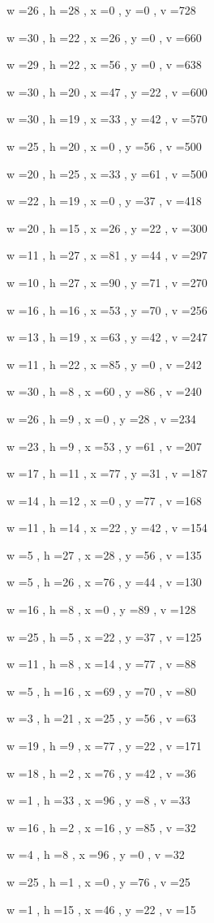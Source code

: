 \documentclass[11pt]{article}
\begin{document}
w =26 , h =28 , x =0 , y =0 , v =728
\par
w =30 , h =22 , x =26 , y =0 , v =660
\par
w =29 , h =22 , x =56 , y =0 , v =638
\par
w =30 , h =20 , x =47 , y =22 , v =600
\par
w =30 , h =19 , x =33 , y =42 , v =570
\par
w =25 , h =20 , x =0 , y =56 , v =500
\par
w =20 , h =25 , x =33 , y =61 , v =500
\par
w =22 , h =19 , x =0 , y =37 , v =418
\par
w =20 , h =15 , x =26 , y =22 , v =300
\par
w =11 , h =27 , x =81 , y =44 , v =297
\par
w =10 , h =27 , x =90 , y =71 , v =270
\par
w =16 , h =16 , x =53 , y =70 , v =256
\par
w =13 , h =19 , x =63 , y =42 , v =247
\par
w =11 , h =22 , x =85 , y =0 , v =242
\par
w =30 , h =8 , x =60 , y =86 , v =240
\par
w =26 , h =9 , x =0 , y =28 , v =234
\par
w =23 , h =9 , x =53 , y =61 , v =207
\par
w =17 , h =11 , x =77 , y =31 , v =187
\par
w =14 , h =12 , x =0 , y =77 , v =168
\par
w =11 , h =14 , x =22 , y =42 , v =154
\par
w =5 , h =27 , x =28 , y =56 , v =135
\par
w =5 , h =26 , x =76 , y =44 , v =130
\par
w =16 , h =8 , x =0 , y =89 , v =128
\par
w =25 , h =5 , x =22 , y =37 , v =125
\par
w =11 , h =8 , x =14 , y =77 , v =88
\par
w =5 , h =16 , x =69 , y =70 , v =80
\par
w =3 , h =21 , x =25 , y =56 , v =63
\par
w =19 , h =9 , x =77 , y =22 , v =171
\par
w =18 , h =2 , x =76 , y =42 , v =36
\par
w =1 , h =33 , x =96 , y =8 , v =33
\par
w =16 , h =2 , x =16 , y =85 , v =32
\par
w =4 , h =8 , x =96 , y =0 , v =32
\par
w =25 , h =1 , x =0 , y =76 , v =25
\par
w =1 , h =15 , x =46 , y =22 , v =15
\par
\newpage
\end{document}
